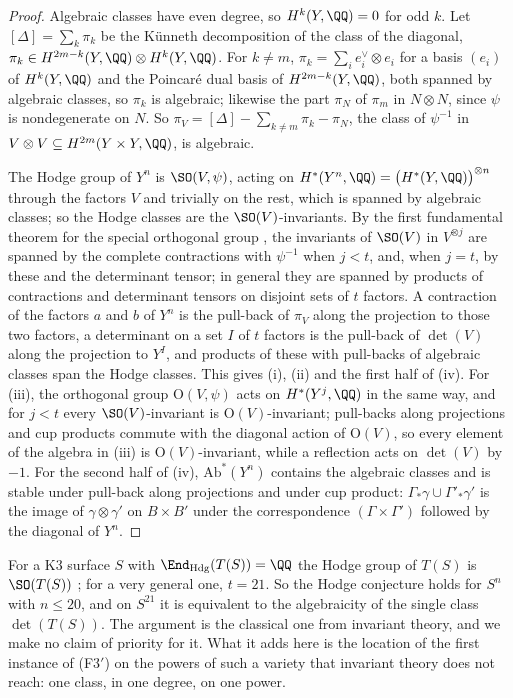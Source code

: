\begin{proof}
Algebraic classes have even degree, so $H^{k}(Y,\QQ)=0$ for odd $k$. Let
$[\Delta]=\sum_{k}\pi_{k}$ be the K\"unneth decomposition of the class of the
diagonal, $\pi_{k}\in H^{2m-k}(Y,\QQ)\otimes H^{k}(Y,\QQ)$. For $k\ne m$,
$\pi_{k}=\sum_{i}e_{i}^{\vee}\otimes e_{i}$ for a basis $(e_{i})$ of
$H^{k}(Y,\QQ)$ and the Poincar\'e dual basis of $H^{2m-k}(Y,\QQ)$, both
spanned by algebraic classes, so $\pi_{k}$ is algebraic; likewise the part
$\pi_{N}$ of $\pi_{m}$ in $N\otimes N$, since $\psi$ is nondegenerate on $N$.
So $\pi_{V}=[\Delta]-\sum_{k\ne m}\pi_{k}-\pi_{N}$, the class of $\psi^{-1}$ in
$V\otimes V\subseteq H^{2m}(Y\times Y,\QQ)$, is algebraic.

The Hodge group of $Y^{n}$ is $\SO(V,\psi)$, acting on
$H^{*}(Y^{n},\QQ)=\bigl(H^{*}(Y,\QQ)\bigr)^{\otimes n}$ through the factors $V$
and trivially on the rest, which is spanned by algebraic classes; so the Hodge
classes are the $\SO(V)$-invariants. By the first fundamental theorem for the
special orthogonal group \cite[Chapter~5]{GW09}, the invariants of $\SO(V)$ in
$V^{\otimes j}$ are spanned by the complete contractions with $\psi^{-1}$ when
$j<t$, and, when $j=t$, by these and the determinant tensor; in general they
are spanned by products of contractions and determinant tensors on disjoint
sets of $t$ factors. A contraction of the factors $a$ and $b$ of $Y^{n}$ is the
pull-back of $\pi_{V}$ along the projection to those two factors, a
determinant on a set $I$ of $t$ factors is the pull-back of $\det(V)$ along
the projection to $Y^{I}$, and products of these with pull-backs of algebraic
classes span the Hodge classes. This gives (i), (ii) and the first half of
(iv). For (iii), the orthogonal group $\mathrm{O}(V,\psi)$ acts on
$H^{*}(Y^{j},\QQ)$ in the same way, and for $j<t$ every $\SO(V)$-invariant is
$\mathrm{O}(V)$-invariant; pull-backs along projections and cup products
commute with the diagonal action of $\mathrm{O}(V)$, so every element of the
algebra in (iii) is $\mathrm{O}(V)$-invariant, while a reflection acts on
$\det(V)$ by $-1$. For the second half of (iv), $\mathrm{Ab}^{*}(Y^{n})$
contains the algebraic classes and is stable under pull-back along projections
and under cup product: $\Gamma_{*}\gamma\cup\Gamma'_{*}\gamma'$ is the image of
$\gamma\otimes\gamma'$ on $B\times B'$ under the correspondence
$(\Gamma\times\Gamma')$ followed by the diagonal of $Y^{n}$.
\end{proof}

For a K3 surface $S$ with $\End_{\mathrm{Hdg}}(T(S))=\QQ$ the Hodge group of
$T(S)$ is $\SO(T(S))$ \cite{Zar83}; for a very general one, $t=21$. So the
Hodge conjecture holds for $S^{n}$ with $n\le20$, and on $S^{21}$ it is
equivalent to the algebraicity of the single class $\det(T(S))$. The argument
is the classical one from invariant theory, and we make no claim of priority
for it. What it adds here is the location of the first instance of
\textup{(F3$'$)} on the powers of such a variety that invariant theory does
not reach: one class, in one degree, on one power.

